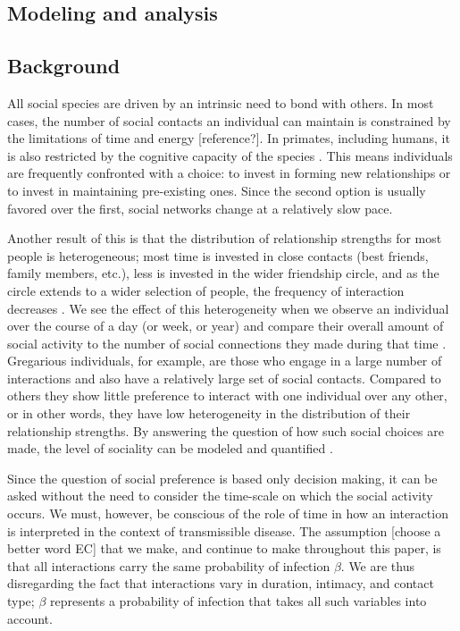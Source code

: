 \documentclass[10pt]{article}
\begin{document}
\begin{multicols}{2}
\section{Modeling and analysis}
\subsection{Background}
\label{background}
All social species are driven by an intrinsic need to bond with others. In most cases, the number of social contacts an individual can maintain is constrained by the limitations of time and energy [reference?]. In primates, including humans, it is also restricted by the cognitive capacity of the species \cite{dunbar1998social,10.1371/journal.pmed.1000316,dunbar2014human}. This means individuals are frequently confronted with a choice: to invest in forming new relationships or to invest in maintaining pre-existing ones. Since the second option is usually favored over the first, social networks change at a relatively slow pace.
 
Another result of this is that the distribution of relationship strengths for most people is heterogeneous; most time is invested in close contacts (best friends, family members, etc.), less is invested in the wider friendship circle, and as the circle extends to a wider selection of people, the frequency of interaction decreases \cite{MacCarron2016151,dunbar1998social}. We see the effect of this heterogeneity when we observe an individual over the course of a day (or week, or year) and compare their overall amount of social activity to the number of social connections they made during that time \cite{10.1371/journal.pone.0022656}. Gregarious individuals, for example, are those who engage in a large number of interactions and also have a relatively large set of social contacts. Compared to others they show little preference to interact with one individual over any other, or in other words, they have low heterogeneity in the distribution of their relationship strengths. By answering the question of how such social choices are made, the level of sociality can be modeled and quantified \cite{karsai2014time}.

Since the question of social preference is based only decision making, it can be asked without the need to consider the time-scale on which the social activity occurs. We must, however, be conscious of the role of time in how an interaction is interpreted in the context of transmissible disease. The assumption [choose a better word EC] that we make, and continue to make throughout this paper, is that all interactions carry the same probability of infection $\beta$. We are thus disregarding the fact that interactions vary in duration, intimacy, and contact type; $\beta$ represents a probability of infection that takes all such variables into account.


\end{multicols}
\end{document}
